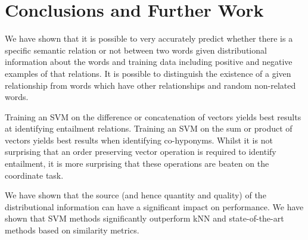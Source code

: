 \documentclass[11pt]{article}
\begin{document}
\section{Conclusions and Further Work}

We have shown that it is possible to very accurately predict whether there is a specific semantic relation or not between two words given distributional information about the words and training data including positive and negative examples of that relations.  It is possible to distinguish the existence of a given relationship from words which have other relationships and random non-related words.  

Training an SVM on the difference or concatenation of vectors yields best results at identifying entailment relations.  Training an SVM on the sum or product of vectors yields best results when identifying co-hyponyms.  Whilst it is not surprising that an order preserving vector operation is required to identify entailment, it is more surprising that these operations are beaten on the coordinate task.  

We have shown that the source (and hence quantity and quality) of the distributional information can have a significant impact on performance.  We have shown that SVM methods significantly outperform kNN and state-of-the-art methods based on similarity metrics. 











\end{document}
